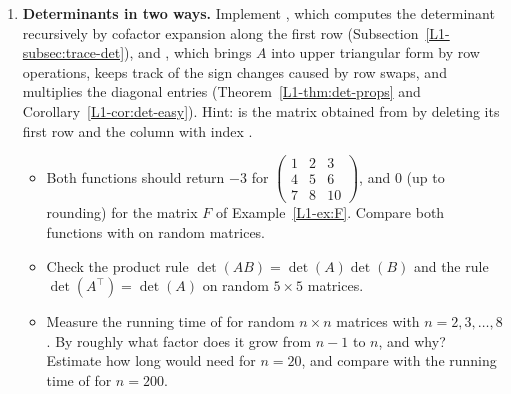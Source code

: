 \begin{enumerate}[label=\textbf{P\arabic*.}, leftmargin=*]
    \item \textbf{Determinants in two ways.} Implement , which computes the determinant recursively by cofactor expansion along the first row (Subsection~\ref{L1-subsec:trace-det}), and , which brings $A$ into upper triangular form by row operations, keeps track of the sign changes caused by row swaps, and multiplies the diagonal entries (Theorem~\ref{L1-thm:det-props} and Corollary~\ref{L1-cor:det-easy}). Hint:  is the matrix obtained from  by deleting its first row and the column with index .
    \begin{itemize}
        \item Both functions should return $-3$ for $\begin{pmatrix} 1 & 2 & 3 \\ 4 & 5 & 6 \\ 7 & 8 & 10 \end{pmatrix}$, and $0$ (up to rounding) for the matrix $F$ of Example~\ref{L1-ex:F}. Compare both functions with  on random matrices.
        \item Check the product rule $\det(AB) = \det(A) \det(B)$ and the rule $\det(A^\top) = \det(A)$ on random $5 \times 5$ matrices.
        \item Measure the running time of  for random $n \times n$ matrices with $n = 2, 3, \ldots, 8$. By roughly what factor does it grow from $n - 1$ to $n$, and why? Estimate how long  would need for $n = 20$, and compare with the running time of  for $n = 200$.
    \end{itemize}


\end{enumerate}
